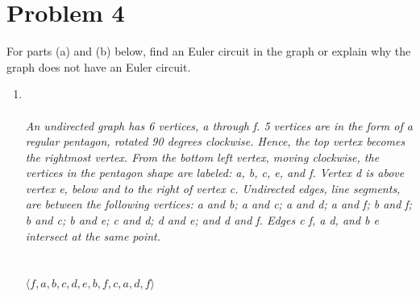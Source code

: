 \documentclass{amsart}
\theoremstyle{definition}
\theoremstyle{Exercise}
\theoremstyle{remark}
\theoremstyle{rule}
\numberwithin{equation}{section}
\begin{document}
 \newpage
 

\section*{Problem 4}
For parts (a) and (b) below, find an Euler circuit in the graph or explain why the graph does not have an Euler circuit.\\
\begin{enumerate}[label=(\alph*)]
\item
{}\\\\
{\color{blue}{\bf Figure 9:} \emph{An undirected graph has 6 vertices, a through f. 5 vertices are in the form of a regular pentagon, rotated 90 degrees clockwise. Hence, the top vertex becomes the rightmost vertex. From the bottom left vertex, moving clockwise, the vertices in the pentagon shape are labeled: a, b, c, e, and f. Vertex d is above vertex e, below and to the right of vertex c. Undirected edges, line segments, are between the following vertices: a and b; a and c; a and d; a and f; b and f; b and c; b and e; c and d; d and e; and d and f. Edges c f, a d, and b e intersect at the same point.
\\
}
}
\\
\\
$\langle f, a, b, c, d, e, b, f, c, a, d, f \rangle$\\
\\\\


\end{enumerate}
\end{document}
